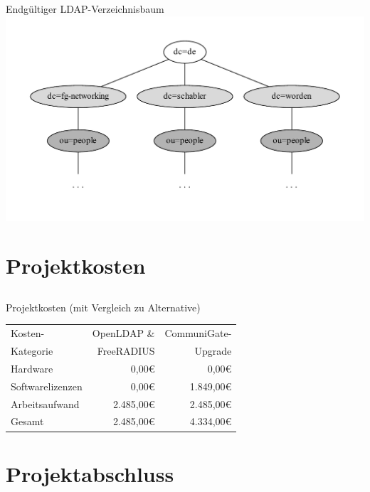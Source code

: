 \documentclass[handout,svgnames]{beamer}
\newcommand{\mcc}[2]{\multicolumn{#1}{|c|}{#2}} %
\begin{document}
\begin{frame}{Endgültiger LDAP-Verzeichnisbaum}
		\includegraphics[width=\textwidth]{Bilder/LDAP-fgn.pdf}
\end{frame}


\section{Projektkosten}
\subsection{}
\begin{frame}{Projektkosten (mit Vergleich zu Alternative)}
	\begin{tabularx}{0.8\textwidth}{|X|r|r|}
		\hline
		Kosten-	&	OpenLDAP \& &	CommuniGate-\\
		Kategorie	&	FreeRADIUS &	Upgrade\\
		\hline
		Hardware &	0,00\euro{} &	0,00\euro{}\\
		\hline
		Softwarelizenzen &	0,00\euro{} &	1.849,00\euro{}\\
		\hline
		Arbeitsaufwand &	2.485,00\euro{} &	2.485,00\euro{}\\
		\hhline{|=|=|=|}
		Gesamt &	2.485,00\euro{} &	4.334,00\euro{}\\
		\hline
	\end{tabularx}
\end{frame}


\section{Projektabschluss}
\end{document}

